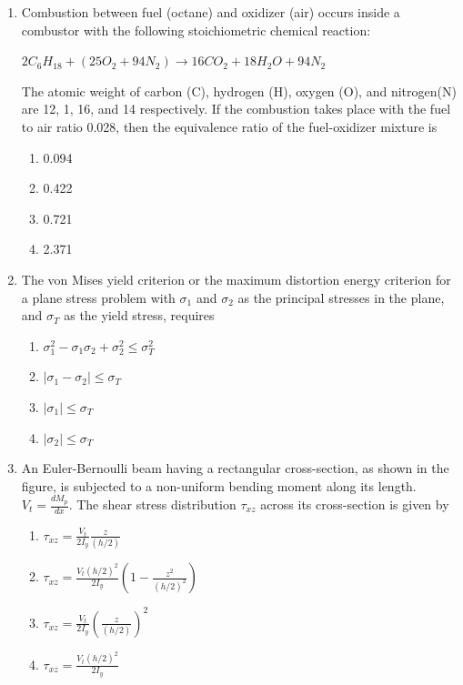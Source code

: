 \documentclass{article}
\begin{document}
\begin{enumerate}
    \item Combustion between fuel (octane) and oxidizer (air) occurs inside a combustor with the following stoichiometric chemical reaction:
    \begin{center}
        $2C_6H_{18} + (25O_2 + 94N_2) \longrightarrow 16CO_2 + 18H_2O + 94N_2$
    \end{center}
    The atomic weight of carbon (C), hydrogen (H), oxygen (O), and nitrogen(N) are 12, 1, 16, and 14 respectively. If the combustion takes place with the fuel to air ratio 0.028, then the equivalence ratio of the  fuel-oxidizer mixture is
    \begin{multicols}{4}
    \begin{enumerate}
        \item 0.094
        \item 0.422
        \item 0.721
        \item 2.371 
    \end{enumerate}
    \end{multicols}
        

    \item The von Mises yield criterion or the maximum distortion energy criterion for a plane stress problem with $\sigma_1$ and $\sigma_2$ as the principal stresses in the plane, and $\sigma_T$ as the yield stress, requires
    \begin{enumerate}
        \item $\sigma_1^2 - \sigma_1 \sigma_2 + \sigma_2^2 \leq \sigma_T^2$
        \item $|\sigma_1 - \sigma_2| \leq \sigma_T$
        \item $|\sigma_1| \leq \sigma_T$
        \item $|\sigma_2| \leq \sigma_T$
    \end{enumerate}
        

    \item An Euler-Bernoulli beam having a rectangular cross-section, as shown in the figure, is subjected to a non-uniform bending moment along its length. $V_t = \frac{d M_p}{dx}$. The shear stress distribution $\tau_{xz}$ across its cross-section is given by
    \begin{figure}[H]
        \centering
        
        \caption{}
        \label{fig:q54}
    \end{figure}
    \begin{enumerate}
        \item $\tau_{xz} = \frac{V_t}{2 I_y} \frac{z}{(h/2)}$
        \item $\tau_{xz} = \frac{V_t (h/2)^2}{2 I_y} \left( 1 - \frac{z^2}{(h/2)^2} \right)$
        \item $\tau_{xz} = \frac{V_t}{2 I_y} \left( \frac{z}{(h/2)} \right)^2$
        \item $\tau_{xz} = \frac{V_t (h/2)^2}{2 I_y}$
    \end{enumerate}
        


\end{enumerate}
\end{document}
